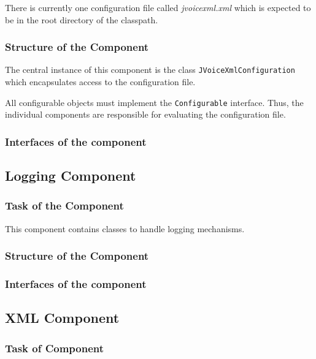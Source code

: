 \documentclass[11pt,a4paper]{article}
\begin{document}
There is currently one configuration file called \emph{jvoicexml.xml}
which is expected to be in the root directory of the classpath.

\subsubsection{Structure of the Component}

The central instance of this component is the class
\texttt{JVoiceXmlConfiguration} which encapsulates access to the
configuration file.

All configurable objects must implement the \texttt{Configurable}
interface. Thus, the individual components are responsible for
evaluating the configuration file.

\subsubsection{Interfaces of the component}

\subsection{Logging Component}
\label{sec:logging-component}

\subsubsection{Task of the Component}

This component contains classes to handle logging mechanisms.

\subsubsection{Structure of the Component}

\subsubsection{Interfaces of the component}

\subsection{XML Component}
\label{sec:xml-component}

\subsubsection{Task of Component}
\end{document}

